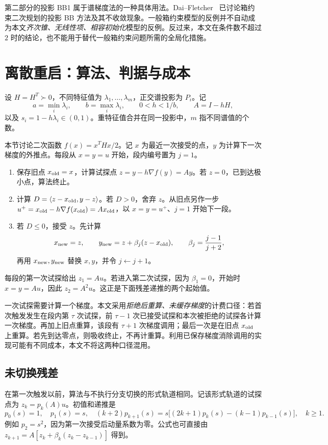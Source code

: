 \documentclass[11pt,a4paper,UTF8,fontset=fandol]{ctexart}
\theoremstyle{remark}\newtheorem{remark}[theorem]{说明}
\begin{document}
第二部分的投影 BB1 属于谱梯度法的一种具体用法。Dai--Fletcher~\cite{daifletcher} 已讨论箱约束二次规划的投影 BB 方法及其不收敛现象。一般箱约束模型的反例并不自动成为本文\emph{齐次锥、无线性项、相容初始化}模型的反例。反过来，本文在条件数不超过 $2$ 时的结论，也不能用于替代一般箱约束问题所需的全局化措施。

\section{离散重启：算法、判据与成本}
设 $H=H^T\succ0$，不同特征值为 $\lambda_1,\ldots,\lambda_m$，正交谱投影为 $P_i$。记
\[
 a=\min_i\lambda_i,\qquad b=\max_i\lambda_i,\qquad
 0<h<1/b,\qquad A=I-hH,
\]
以及 $s_i=1-h\lambda_i\in(0,1)$。重特征值合并在同一投影中，$m$ 指不同谱值的个数。

本节讨论二次函数 \(f(x)=x^THx/2\)。记 \(x\) 为最近一次接受的点，\(y\) 为计算下一次梯度的外推点。每段从 \(x=y=u\) 开始，段内编号置为 \(j=1\)。
\begin{enumerate}[label=(\arabic*)]
\item 保存旧点 \(x_{\rm old}=x\)，计算试探点 \(z=y-h\nabla f(y)=Ay\)。若 \(z=0\)，已到达极小点，算法终止。
\item 计算 \(D=\langle z-x_{\rm old},y-z\rangle\)。若 \(D>0\)，舍弃 \(z\)。从旧点另作一步 \(u^+=x_{\rm old}-h\nabla f(x_{\rm old})=Ax_{\rm old}\)，以 \(x=y=u^+\)、\(j=1\) 开始下一段。
\item 若 \(D\le0\)，接受 \(z\)。先计算
\[
 x_{\rm new}=z,\qquad y_{\rm new}=z+\beta_j(z-x_{\rm old}),\qquad
 \beta_j=\frac{j-1}{j+2},
\]
再用 \(x_{\rm new},y_{\rm new}\) 替换 \(x,y\)，并令 \(j\leftarrow j+1\)。
\end{enumerate}
每段的第一次试探给出 \(z_1=Au\)。若进入第二次试探，因为 \(\beta_1=0\)，开始时 \(x=y=Au\)，因此 \(z_2=A^2u\)。这正是下面残差递推的两个起始值。

一次试探需要计算一个梯度。本文采用\emph{拒绝后重算、未缓存梯度}的计费口径：若首次触发发生在段内第 $\tau$ 次试探，前 $\tau-1$ 次已接受试探和本次被拒绝的试探各计算一次梯度。再加上旧点重算，该段有 $\tau+1$ 次梯度调用；最后一次是在旧点 $x_{\rm old}$ 上重算。若先到达零点，则吸收终止，不再计重算。利用已保存梯度消除调用的实现可能有不同成本，本文不将这两种口径混用。

\subsection{未切换残差}
在第一次触发以前，算法与不执行分支切换的形式轨道相同。记该形式轨道的试探点为 $z_k=p_k(A)u$。初值和递推是
\begin{equation}\label{eq:rec}
 p_0(s)=1,\quad p_1(s)=s,\quad
 (k+2)p_{k+1}(s)
 =s\bigl[(2k+1)p_k(s)-(k-1)p_{k-1}(s)\bigr],\quad k\ge1.
\end{equation}
例如 $p_2=s^2$，因为第一次接受后动量系数为零。公式也可直接由
$z_{k+1}=A[z_k+\beta_k(z_k-z_{k-1})]$ 得到。
\end{document}
